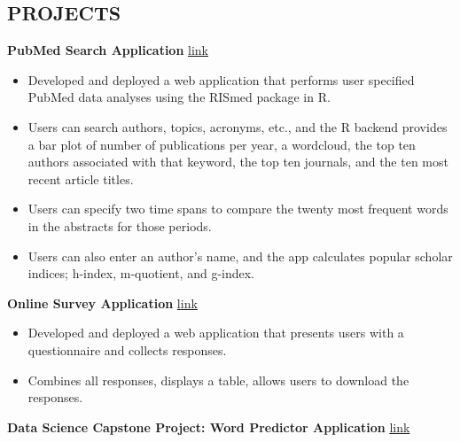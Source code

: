 \documentclass[margin,10pt]{res} %
\begin{document}
\begin{resume}
\section{PROJECTS
\newline
\newline
}
\textbf{PubMed Search Application} \hfill \href{https://aarongowins.shinyapps.io/PubMedSearch}{link}
\begin{itemize} %
\item Developed and deployed a web application that performs user specified PubMed data analyses using the RISmed package in R. 
\item Users can search authors, topics, acronyms, etc., and the R backend provides a bar plot of number of publications per year, a wordcloud, the top ten authors associated with that keyword, the top ten journals, and the ten most recent article titles. 
\item Users can specify two time spans to compare the twenty most frequent words in the abstracts for those periods. 
\item Users can also enter an author's name, and the app calculates popular scholar indices; h-index, m-quotient, and g-index. 
\end{itemize}%
\textbf{Online Survey Application} \hfill \href{https://aarongowins.shinyapps.io/HTMLui/}{link}
\begin{itemize} %
\item Developed and deployed a web application that presents users with a \\ questionnaire and collects responses.
\item Combines all responses, displays a table, allows users to download the responses.
\end{itemize}
\textbf{Data Science Capstone Project: Word Predictor Application}  \hfill \href{https://aarongowins.shinyapps.io/CapstonePractice/}{link } 
\begin{itemize} %

\end{itemize}
\end{resume}
\end{document}
